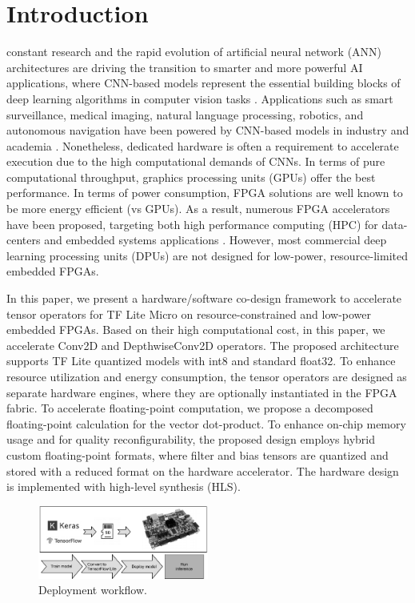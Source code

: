 
\section{Introduction}
\label{sec:introduction}
 constant research and the rapid evolution of artificial neural network (ANN) architectures are driving the transition to smarter and more powerful AI applications, where CNN-based models represent the essential building blocks of deep learning algorithms in computer vision tasks \cite{hassaballah2020deep}. Applications such as smart surveillance, medical imaging, natural language processing, robotics, and autonomous navigation have been powered by CNN-based models in industry and academia \cite{dhillon2020convolutional}. Nonetheless, dedicated hardware is often a requirement to accelerate execution due to the high computational demands of CNNs. In terms of pure computational throughput, graphics processing units (GPUs) offer the best performance\cite{nurvitadhi2017can}. In terms of power consumption, FPGA solutions are well known to be more energy efficient (vs GPUs). As a result, numerous FPGA accelerators have been proposed, targeting both high performance computing (HPC) for data-centers and embedded systems applications \cite{abdelouahab2018accelerating}. However, most commercial deep learning processing units (DPUs) are not designed for low-power, resource-limited embedded FPGAs.

In this paper, we present a hardware/software co-design framework to accelerate tensor operators for TF Lite Micro on resource-constrained and low-power embedded FPGAs. Based on their high computational cost, in this paper, we accelerate Conv2D and DepthwiseConv2D operators. The proposed architecture supports TF Lite quantized models with int8 and standard float32. To enhance resource utilization and energy consumption, the tensor operators are designed as separate hardware engines, where they are optionally instantiated in the FPGA fabric. To accelerate floating-point computation, we propose a decomposed floating-point calculation for the vector dot-product. To enhance on-chip memory usage and for quality reconfigurability, the proposed design employs hybrid custom floating-point formats, where filter and bias tensors are quantized and stored with a reduced format on the hardware accelerator. The hardware design is implemented with high-level synthesis (HLS).

\begin{figure}[t!]
	\centering
	\includegraphics[width=0.5\textwidth]{../figures/workflow.pdf}
	\caption{Deployment workflow.}
	\label{fig:workflow}
\end{figure}

